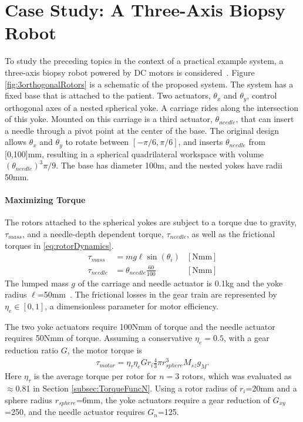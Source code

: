 
\section{Case Study: A Three-Axis Biopsy Robot}\label{sec:experiment}


To study the preceding topics in the context of a practical example system, a three-axis biopsy robot powered by DC motors is considered~\cite{Walsh2010}.  Figure \ref{fig:3orthogonalRotors} is a schematic of the proposed system.  The system has a fixed base that is attached to the patient.   Two actuators, $\theta_x$ and $\theta_y$, control orthogonal axes of a nested spherical yoke.  A carriage rides along the intersection of this yoke.  Mounted on this carriage is a third actuator, $\theta_{needle}$,  that can insert a needle through a pivot point at the center of the base.  The original design allows $\theta_x$ and $\theta_y$ to rotate between $[-\pi/6,\pi/6]$, and inserts $\theta_{needle}$ from [0,100]mm, resulting in a  spherical quadrilateral workspace with volume $(\theta_{needle})^3\pi/9$.  The base has diameter 100m, and the nested yokes have radii 50mm.



\setcounter{paragraph}{0}
\paragraph{Maximizing Torque}
The rotors attached to the spherical yokes are subject to a torque due to gravity, $\tau_{mass}$, and a needle-depth dependent torque, $\tau_{needle}$, as well as the frictional torques in \eqref{eq:rotorDynamics}.
\begin{align}
\tau_{mass} &= m  g  \ell  \sin(\theta_i) &\mathrm{[Nmm]} \nonumber \\
\tau_{needle} &= \theta_{needle} \frac{60}{100} &\mathrm{[Nmm]} 
\end{align}
The lumped mass $g$ of the carriage and needle actuator is 0.1kg and the yoke radius $\ell$=50mm~\cite{Walsh2010}.  The frictional losses in the gear train are represented by $\eta_e \in[0,1]$, a dimensionless parameter for motor efficiency.  

The two yoke actuators require 100Nmm of torque and the needle actuator requires 50Nmm of torque.  Assuming a conservative $\eta_e=0.5$, with a gear reduction ratio $G$, the motor torque is
\begin{align}
\tau_{motor}  =  \eta_\tau  \eta_e G r_i \frac{4}{3} \pi r_{sphere}^3 M_{sz} g_{M}  . \label{eq:RotorForceGear}
\end{align}
Here $\eta_\tau$ is the average torque per rotor for $n=3$ rotors, which was evaluated as $\approx$0.81 in  Section \ref{subsec:TorqueFuncN}. 
Using a rotor radius of $r_i$=20mm and a sphere radius $r_{sphere}$=6mm, the yoke actuators require a gear reduction of $G_{xy}$=250, and the needle actuator requires $G_{n}$=125. 



